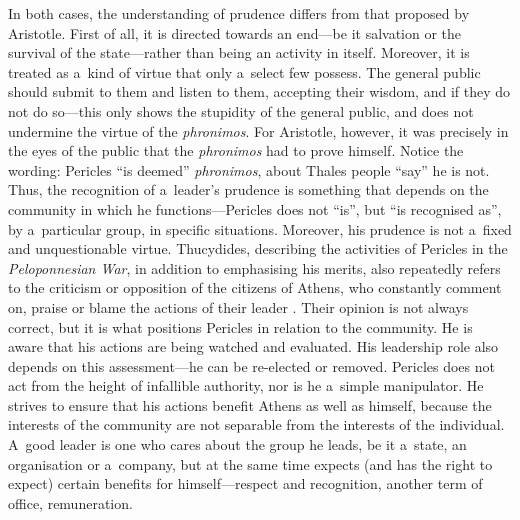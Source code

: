 In both cases, the understanding of prudence differs from that proposed by Aristotle. First of all, it is directed towards an end---be it salvation or the survival of the state---rather than being an activity in itself. Moreover, it is treated as a~kind of virtue that only a~select few possess. The general public should submit to them and listen to them, accepting their wisdom, and if they do not do so---this only shows the stupidity of the general public, and does not undermine the virtue of the \textit{phronimos}. For Aristotle, however, it was precisely in the eyes of the public that the \textit{phronimos} had to prove himself. Notice the wording: Pericles ``is deemed'' \textit{phronimos}, about Thales people ``say'' he is not. Thus, the recognition of a~leader's prudence is something that depends on the community in which he functions---Pericles does not ``is'', but ``is recognised as'', by a~particular group, in specific situations. Moreover, his prudence is not a~fixed and unquestionable virtue. Thucydides, describing the activities of Pericles in the \textit{Peloponnesian War}, in addition to emphasising his merits, also repeatedly refers to the criticism or opposition of the citizens of Athens, who constantly comment on, praise or blame the actions of their leader 
\parencite[][]{hammond_peloponnesian_2009}. %
 Their opinion is not always correct, but it is what positions Pericles in relation to the community. He is aware that his actions are being watched and evaluated. His leadership role also depends on this assessment---he can be re-elected or removed. Pericles does not act from the height of infallible authority, nor is he a~simple manipulator. He strives to ensure that his actions benefit Athens as well as himself, because the interests of the community are not separable from the interests of the individual. A~good leader is one who cares about the group he leads, be it a~state, an organisation or a~company, but at the same time expects (and has the right to expect) certain benefits for himself---respect and recognition, another term of office, remuneration.



